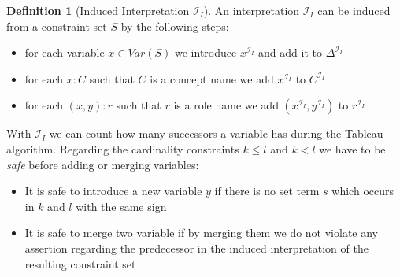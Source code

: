 \documentclass[a4paper,11pt]{scrartcl}
\theoremstyle{break}
\theoremstyle{definition}
\newtheorem{mydef}{Definition}
\begin{document}
\begin{mydef}[Induced Interpretation $\mathcal{I}_I$]
An interpretation $\mathcal{I}_I$ can be induced from a constraint set $S$ by the following steps:
\begin{itemize}
\item for each variable $x\in Var(S)$ we introduce $x^{\mathcal{I}_I}$ and add it to $\Delta^{\mathcal{I}_I}$
\item for each $x:C$ such that $C$ is a concept name we add $x^{\mathcal{I}_I}$ to $C^{\mathcal{I}_I}$
\item for each $(x,y):r$ such that $r$ is a role name we add $(x^{\mathcal{I}_I},y^{\mathcal{I}_I})$ to $r^{\mathcal{I}_I}$
\end{itemize}
With $\mathcal{I}_I$ we can count how many successors a variable has during the Tableau-algorithm. Regarding the cardinality constraints $k\leq l$ and $k<l$ we have to be \textit{safe} before adding or merging variables:
\begin{itemize}
\item It is safe to introduce a new variable $y$ if there is no set term $s$ which occurs in $k$ and $l$ with the same sign
\item It is safe to merge two variable if by merging them we do not violate any assertion regarding the predecessor in the induced interpretation of the resulting constraint set
\end{itemize}
\end{mydef}
\end{document}
